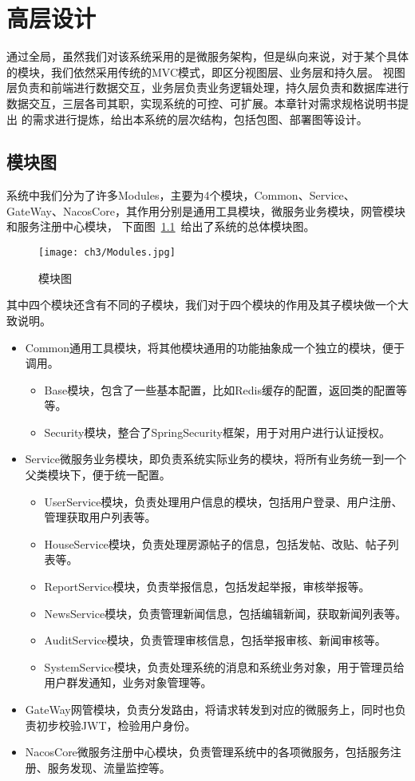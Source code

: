 \chapter{高层设计}
通过全局，虽然我们对该系统采用的是微服务架构，但是纵向来说，对于某个具体的模块，我们依然采用传统的MVC模式，即区分视图层、业务层和持久层。
视图层负责和前端进行数据交互，业务层负责业务逻辑处理，持久层负责和数据库进行数据交互，三层各司其职，实现系统的可控、可扩展。本章针对需求规格说明书提出
的需求进行提炼，给出本系统的层次结构，包括包图、部署图等设计。

\section{模块图}
系统中我们分为了许多Modules，主要为4个模块，Common、Service、GateWay、NacosCore，其作用分别是通用工具模块，微服务业务模块，网管模块和服务注册中心模块，
下面图~\ref{fig:Modules}~给出了系统的总体模块图。
\begin{figure}[htbp]
    \centering
    \texttt{[image: ch3/Modules.jpg]}
    \caption{模块图}\label{fig:Modules}
    \vspace{\baselineskip} %
\end{figure}

其中四个模块还含有不同的子模块，我们对于四个模块的作用及其子模块做一个大致说明。
\begin{itemize}
    \item Common通用工具模块，将其他模块通用的功能抽象成一个独立的模块，便于调用。
    \begin{itemize}
        \item Base模块，包含了一些基本配置，比如Redis缓存的配置，返回类的配置等等。
        \item Security模块，整合了SpringSecurity框架，用于对用户进行认证授权。
    \end{itemize}
    \item Service微服务业务模块，即负责系统实际业务的模块，将所有业务统一到一个父类模块下，便于统一配置。
    \begin{itemize}
        \item UserService模块，负责处理用户信息的模块，包括用户登录、用户注册、管理获取用户列表等。
        \item HouseService模块，负责处理房源帖子的信息，包括发帖、改贴、帖子列表等。
        \item ReportService模块，负责举报信息，包括发起举报，审核举报等。
        \item NewsService模块，负责管理新闻信息，包括编辑新闻，获取新闻列表等。
        \item AuditService模块，负责管理审核信息，包括举报审核、新闻审核等。
        \item SystemService模块，负责处理系统的消息和系统业务对象，用于管理员给用户群发通知，业务对象管理等。
    \end{itemize}
    \item GateWay网管模块，负责分发路由，将请求转发到对应的微服务上，同时也负责初步校验JWT，检验用户身份。
    \item NacosCore微服务注册中心模块，负责管理系统中的各项微服务，包括服务注册、服务发现、流量监控等。
\end{itemize}

